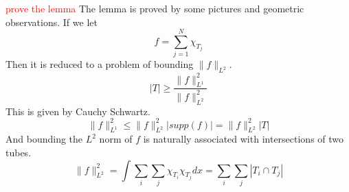 \textcolor{red}{prove the lemma}
The lemma is proved by some pictures and geometric observations. If we let 
\begin{equation*}
    f=\sum_{j=1}^N\chi_{T_j}
\end{equation*}
Then it is reduced to a problem of bounding $\|f\|_{L^2}$. 
\begin{equation*}
    |T|\geq\frac{\|f\|_{L^1}^2}{\|f\|_{L^2}^2}
\end{equation*}
This is given by Cauchy Schwartz.
\begin{equation*}
    \|f\|_{L^1}^2\leq\|f\|_{L^2}^2|supp(f)|=\|f\|_{L^2}^2|T|
\end{equation*}
And bounding the $L^2$ norm of $f$ is naturally associated with intersections of two tubes.
\begin{equation*}
    \|f\|_{L^2}^2=\int \sum_i\sum_j\chi_{T_i}\chi_{T_j}dx=\sum_i\sum_j|T_i\cap T_j|
\end{equation*}

